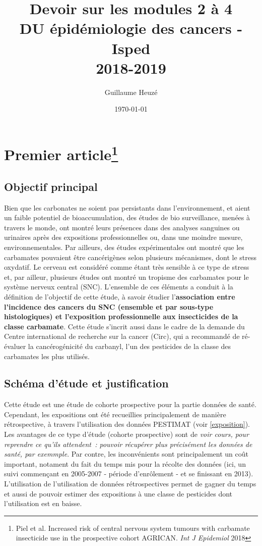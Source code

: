 \documentclass[10pt]{article}
\begin{document}
\title{Devoir sur les modules 2 à 4\\
\small{DU épidémiologie des cancers - Isped\\
2018-2019}}
\author{Guillaume Heuzé}
\date{\today}
\maketitle

\section{Premier article\protect\footnote{Piel et al. Increased risk of central nervous system tumours with carbamate insecticide use in the prospective cohort AGRICAN. \emph{Int J Epidemiol} 2018}}

\subsection{Objectif principal}
Bien que les carbonates ne soient pas persistants dans l'environnement, et aient un faible potentiel de bioaccumulation, des études de bio surveillance, menées à travers le monde, ont montré leurs présences dans des analyses sanguines ou urinaires après des expositions professionnelles ou, dans une moindre mesure, environnementales. Par ailleurs, des études expérimentales ont montré que les carbamates pouvaient être cancérigènes selon plusieurs mécanismes, dont le stress oxydatif. Le cerveau est considéré comme étant très sensible à ce type de stress et, par ailleur, plusieurs études ont montré un tropisme des carbamates pour le système nerveux central (SNC). L'ensemble de ces éléments a conduit à la définition de l'objectif de cette étude, à savoir étudier l'\textbf{association entre l'incidence des cancers du SNC (ensemble et par sous-type histologiques) et l'exposition professionnelle aux insecticides de la classe carbamate}. Cette étude s'incrit aussi dans le cadre de la demande du Centre international de recherche sur la cancer (Circ), qui a recommandé de ré-évaluer la cancérogénicité du carbanyl, l'un des pesticides de la classe des carbamates les plus utilisés.

\subsection{Schéma d'étude et justification}
Cette étude est une étude de cohorte prospective pour la partie données de santé. Cependant, les expositions ont été recueillies principalement de manière rétrospective, à travers l'utilisation des données PESTIMAT (voir \ref{exposition}). Les avantages de ce type d'étude (cohorte prospective) sont de \emph{voir cours, pour reprendre ce qu'ils attendent~: pouvoir récupérer plus précisément les données de santé, par exemmple}. Par contre, les inconvénients sont principalement un coût important, notament du fait du temps mis pour la récolte des données (ici, un suivi commençant en 2005-2007 - période d'enrôlement - et se finissant en 2013). L'utilisation de l'utilisation de données rétrospectives permet de gagner du temps et aussi de pouvoir estimer des expositions à une classe de pesticides dont l'utilisation est en baisse. 
\end{document}
